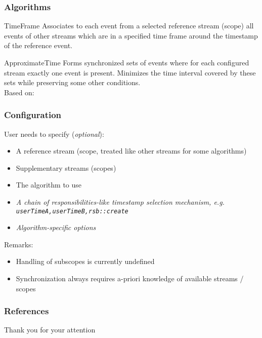 \documentclass[hyperref={pdfpagelabels=false}]{beamer}
\begin{document}
\begin{frame}
    \frametitle{Algorithms}
    \begin{block}{TimeFrame}
        Associates to each event from a selected reference stream (scope) all events of other streams which are in a specified time frame around the timestamp of the reference event.
    \end{block}
    \begin{block}{ApproximateTime}
        Forms synchronized sets of events where for each configured stream exactly one event is present. Minimizes the time interval covered by these sets while preserving some other conditions.\\
        Based on: 
    \end{block}
\end{frame}

\begin{frame}
    \frametitle{Configuration}
    User needs to specify (\textit{optional}):
    \begin{itemize}
        \item A reference stream (scope, treated like other streams for some algorithms)
        \item Supplementary streams (scopes)
        \item The algorithm to use
        \item \textit{A chain of responsibilities-like timestamp selection mechanism, e.g. \texttt{userTimeA,userTimeB,rsb::create}}
        \item \textit{Algorithm-specific options}
    \end{itemize}
    Remarks:
    \begin{itemize}
        \item Handling of subscopes is currently undefined
        \item Synchronization always requires a-priori knowledge of available streams / scopes
    \end{itemize}
\end{frame}
    
\begin{frame}
	\frametitle{References}
	\begin{center}
		Thank you for your attention
	\end{center}
\end{frame}
\end{document}
